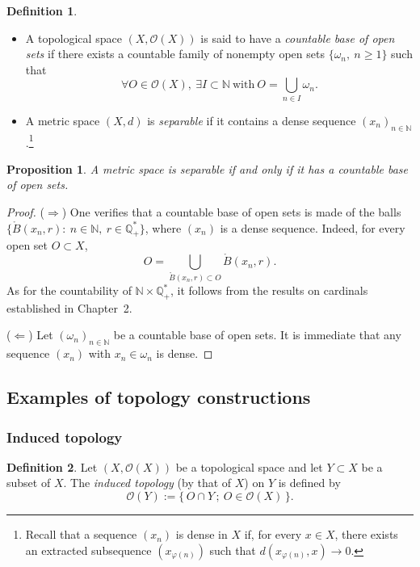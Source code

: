 \documentclass[12pt]{article}
\newtheorem{proposition}{Proposition}[section]
\theoremstyle{definition}
\newtheorem{definition}{Definition}[section]
\begin{document}
\begin{definition}
\begin{itemize}[leftmargin=1.5em]
\item[(a)] A topological space $(X,\mathcal{O}(X))$ is said to have a \emph{countable base of open sets} if there exists a countable family of nonempty open sets $\{\omega_n,\ n\ge 1\}$ such that
\[
\forall O\in\mathcal{O}(X),\ \exists I\subset\mathbb{N}\ \text{with}\ O=\bigcup_{n\in I}\omega_n .
\]
\item[(b)] A metric space $(X,d)$ is \emph{separable} if it contains a dense sequence $(x_n)_{n\in\mathbb{N}}$.\footnote{Recall that a sequence $(x_n)$ is dense in $X$ if, for every $x\in X$, there exists an extracted subsequence $(x_{\varphi(n)})$ such that $d(x_{\varphi(n)},x)\to 0$.}
\end{itemize}
\end{definition}

\begin{proposition}
A metric space is separable if and only if it has a countable base of open sets.
\end{proposition}

\begin{proof}
($\Rightarrow$) One verifies that a countable base of open sets is made of the balls
$\{\mathring{B}(x_n,r):\ n\in\mathbb{N},\ r\in\mathbb{Q}_+^{\!*}\}$, where $(x_n)$ is a dense sequence.
Indeed, for every open set $O\subset X$,
\[
O=\bigcup_{\mathring{B}(x_n,r)\subset O}\mathring{B}(x_n,r).
\]
As for the countability of $\mathbb{N}\times\mathbb{Q}_+^{\!*}$, it follows from the results on cardinals established in Chapter~2.

($\Leftarrow$) Let $(\omega_n)_{n\in\mathbb{N}}$ be a countable base of open sets.
It is immediate that any sequence $(x_n)$ with $x_n\in\omega_n$ is dense.\end{proof}

\subsection{Examples of topology constructions}

\subsubsection{Induced topology}

\begin{definition}
Let $(X,\mathcal{O}(X))$ be a topological space and let $Y\subset X$ be a subset of $X$.
The \emph{induced topology} (by that of $X$) on $Y$ is defined by
\[
\mathcal{O}(Y):=\{\,O\cap Y\,;\ O\in\mathcal{O}(X)\,\}.
\]
\end{definition}
\end{document}
